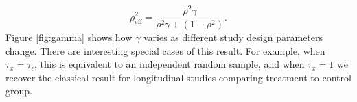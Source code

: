 \documentclass[11pt]{article}
\begin{document}
\begin{multicols}{2}
\begin{equation} \label{eq:rhoeff}
\rho^2_{\mbox{eff}} =\frac{\rho^2\gamma}{\rho^2\gamma+(1-\rho^2)}.
\end{equation}
\noindent Figure \ref{fig:gamma} shows how $\gamma$ varies as different study design parameters change. There are interesting special cases of this result. For example, when $\tau_x = \tau_\epsilon$, this is equivalent to an independent random sample, and when $\tau_x = 1$ we recover the classical result for longitudinal studies comparing treatment to control group.

\end{multicols}
\end{document}
